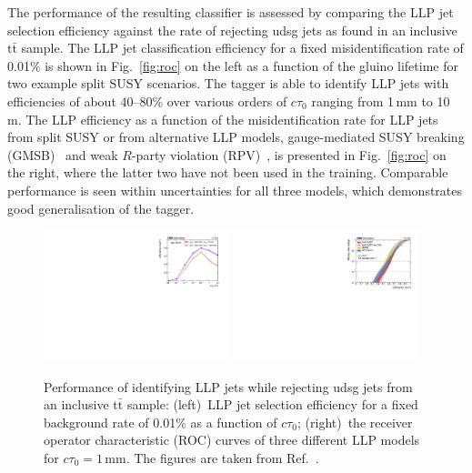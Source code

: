 \documentclass{webofc}
\newcommand{\ctau}{\ensuremath{c\tau_{0}}\xspace}
\newcommand{\ttbar}{\ensuremath{\textrm{t}\bar{\textrm{t}}}\xspace}
\begin{document}
The performance of the resulting classifier is assessed by comparing the LLP jet selection efficiency against the rate of rejecting udsg jets as found in an inclusive \ttbar sample. The LLP jet classification efficiency for a fixed misidentification rate of 0.01\% is shown in Fig.~\ref{fig:roc} on the left as a function of the gluino lifetime for two example split SUSY scenarios. The tagger is able to identify LLP jets with efficiencies of about 40--80\% over various orders of \ctau ranging from 1\,\textrm{mm} to 10\,\textrm{m}. The LLP efficiency as a function of the misidentification rate for LLP jets from split SUSY or from alternative LLP models, gauge-mediated SUSY breaking (GMSB)~\cite{gmsb} and weak $R$-party violation (RPV)~\cite{rpv}, is presented in Fig.~\ref{fig:roc} on the right, where the latter two have not been used in the training. Comparable performance is seen within uncertainties for all three models, which demonstrates good generalisation of the tagger. 

\begin{figure}[!ht]
\includegraphics[width=0.48\textwidth]{figs/ctau.pdf}\hspace{0.03\textwidth}
\includegraphics[width=0.48\textwidth]{figs/roc_1.pdf}
\centering
\caption{\label{fig:roc}Performance of identifying LLP jets while rejecting udsg jets from an inclusive \ttbar sample: (left)~LLP jet selection efficiency for a fixed background rate of 0.01\% as a function of \ctau; (right)~the receiver operator characteristic (ROC) curves of three different LLP models for $\ctau=1\,\textrm{mm}$. The figures are taken from Ref.~\cite{CMS-EXO-19-011}.}
\label{fig-3}
\end{figure}
\end{document}
